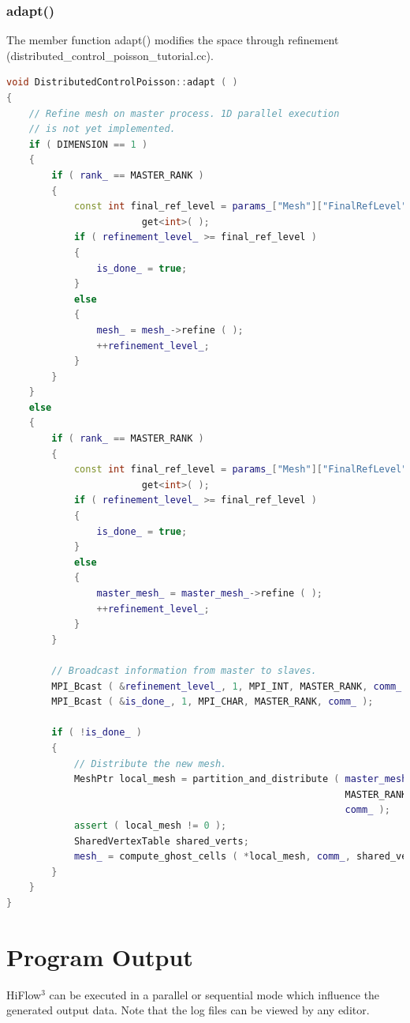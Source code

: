 \documentclass[a4paper, 11pt, twoside]{article}
\begin{document}
\subsubsection{adapt()}\label{adapt}
The member function adapt() modifies the space through refinement (distributed\_control\_poisson\_tutorial.cc). 

\begin{lstlisting}[language=C++, basicstyle={\footnotesize, \ttfamily}, keywordstyle=\color{blue}, numbers=none, tabsize=4]
void DistributedControlPoisson::adapt ( )
{
    // Refine mesh on master process. 1D parallel execution 
    // is not yet implemented.
    if ( DIMENSION == 1 )
    {
        if ( rank_ == MASTER_RANK )
        {
            const int final_ref_level = params_["Mesh"]["FinalRefLevel"].
            			get<int>( );
            if ( refinement_level_ >= final_ref_level )
            {
                is_done_ = true;
            }
            else
            {
                mesh_ = mesh_->refine ( );
                ++refinement_level_;
            }
        }
    }
    else
    {
        if ( rank_ == MASTER_RANK )
        {
            const int final_ref_level = params_["Mesh"]["FinalRefLevel"].
            			get<int>( );
            if ( refinement_level_ >= final_ref_level )
            {
                is_done_ = true;
            }
            else
            {
                master_mesh_ = master_mesh_->refine ( );
                ++refinement_level_;
            }
        }

        // Broadcast information from master to slaves.
        MPI_Bcast ( &refinement_level_, 1, MPI_INT, MASTER_RANK, comm_ );
        MPI_Bcast ( &is_done_, 1, MPI_CHAR, MASTER_RANK, comm_ );

        if ( !is_done_ )
        {
            // Distribute the new mesh.
            MeshPtr local_mesh = partition_and_distribute ( master_mesh_, 
                                                            MASTER_RANK,
                                                            comm_ );
            assert ( local_mesh != 0 );
            SharedVertexTable shared_verts;
            mesh_ = compute_ghost_cells ( *local_mesh, comm_, shared_verts );
        }
    }
}
\end{lstlisting}

\section{Program Output}
HiFlow$^3$ can be executed in a parallel or sequential mode which influence the generated output data. Note that the log files can be viewed by any editor.
\end{document}
